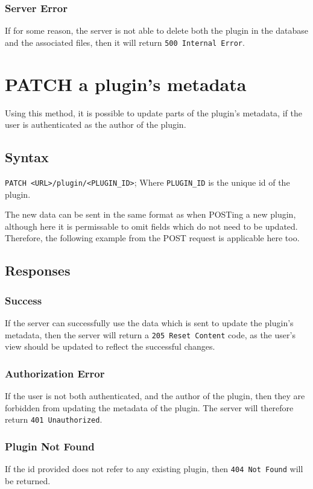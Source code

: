\documentclass[a4paper, 12pt]{article}
\begin{document}
			\subsubsection{Server Error}
				If for some reason, the server is not able to delete both the plugin in the database and the associated files, then it will return \verb|500 Internal Error|.

	\section{PATCH a plugin's metadata}
		Using this method, it is possible to update parts of the plugin's metadata, if the user is authenticated as the author of the plugin.

		\subsection{Syntax}
			\verb|PATCH <URL>/plugin/<PLUGIN_ID>|; \footnotesize{Where \verb|PLUGIN_ID| is the unique id of the plugin.}

			The new data can be sent in the same format as when POSTing a new plugin, although here it is permissable to omit fields which do not need to be updated. Therefore, the following example from the POST request is applicable here too.

			

		\subsection{Responses}
			\subsubsection{Success}
				If the server can successfully use the data which is sent to update the plugin's metadata, then the server will return a \verb|205 Reset Content| code, as the user's view should be updated to reflect the successful changes.

			\subsubsection{Authorization Error}
				If the user is not both authenticated, and the author of the plugin, then they are forbidden from updating the metadata of the plugin. The server will therefore return \verb|401 Unauthorized|.

			\subsubsection{Plugin Not Found}
				If the id provided does not refer to any existing plugin, then \verb|404 Not Found| will be returned.
\end{document}

